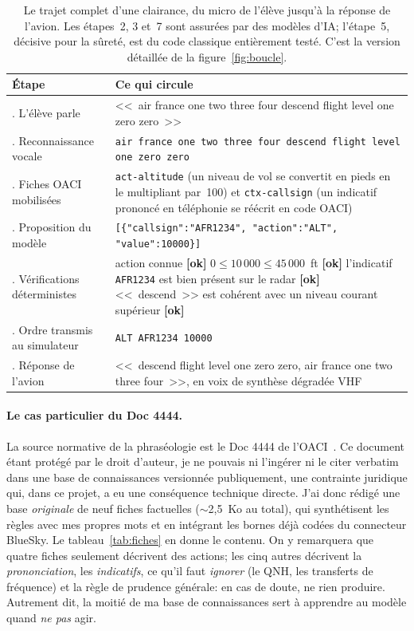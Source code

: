 \documentclass[11pt,a4paper]{article}
\newcommand{\ok}{\textcolor{atcgreen}{\footnotesize\textbf{[ok]}}}
\begin{document}
\begin{table}[!htbp]
\centering
\caption[Le trajet complet d'une clairance, du micro à la réponse de l'avion]{Le trajet complet d'une clairance, du micro de l'élève jusqu'à la réponse de
l'avion. Les étapes~2, 3 et~7 sont assurées par des modèles d'IA; l'étape~5, décisive pour
la sûreté, est du code classique entièrement testé. C'est la version détaillée de la
figure~\ref{fig:boucle}.}
\label{tab:trajet}
\small
\begin{tabular}{>{\raggedright\arraybackslash}p{4.2cm} >{\raggedright\arraybackslash}p{11.2cm}}
\toprule
\rowcolor{lightgray}\textbf{Étape} & \textbf{Ce qui circule}\\
\midrule
1. L'élève parle & <<~air france one two three four descend flight level one zero zero~>>\\
2. Reconnaissance vocale & \texttt{air france one two three four descend flight level one zero zero}\\
3. Fiches OACI mobilisées & \texttt{act-altitude} (un niveau de vol se convertit en pieds en le multipliant par~100) et \texttt{ctx-callsign} (un indicatif prononcé en téléphonie se réécrit en code OACI)\\
4. Proposition du modèle & \texttt{[\{"callsign":"AFR1234", "action":"ALT", "value":10000\}]}\\
5. Vérifications déterministes & action connue \ok\; $0 \leq 10\,000 \leq 45\,000$~ft \ok\; l'indicatif \texttt{AFR1234} est bien présent sur le radar \ok\; <<~descend~>> est cohérent avec un niveau courant supérieur \ok\\
6. Ordre transmis au simulateur & \texttt{ALT AFR1234 10000}\\
7. Réponse de l'avion & <<~descend flight level one zero zero, air france one two three four~>>, en voix de synthèse dégradée VHF\\
\bottomrule
\end{tabular}
\end{table}

\paragraph{Le cas particulier du Doc 4444.} La source normative de la phraséologie est le Doc 4444 de l'OACI~\cite{icao4444}. Ce document étant protégé par le droit d'auteur, je ne pouvais ni l'ingérer ni le citer verbatim dans une base de connaissances versionnée publiquement, une contrainte juridique qui, dans ce projet, a eu une conséquence technique directe. J'ai donc rédigé une base \emph{originale} de neuf fiches factuelles ($\sim$2,5~Ko au total), qui synthétisent les règles avec mes propres mots et en intégrant les bornes déjà codées du connecteur BlueSky. Le tableau~\ref{tab:fiches} en donne le contenu. On y remarquera que quatre fiches seulement décrivent des actions; les cinq autres décrivent la \emph{prononciation}, les \emph{indicatifs}, ce qu'il faut \emph{ignorer} (le QNH, les transferts de fréquence) et la règle de prudence générale: en cas de doute, ne rien produire. Autrement dit, la moitié de ma base de connaissances sert à apprendre au modèle quand \emph{ne pas} agir. 
\end{document}
